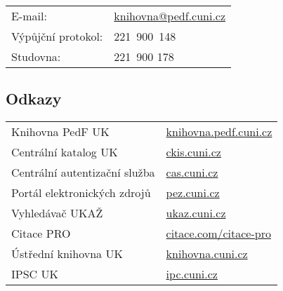 \begin{tabular}{@{}ll@{}}
  E-mail:& \url{knihovna@pedf.cuni.cz}\\

  Výpůjční protokol:& 221~900~148\\

  Studovna:& 221~900 178
\end{tabular}

\subsection{Odkazy}

\begin{tabular}{@{}ll@{}}
  Knihovna PedF UK& \url{knihovna.pedf.cuni.cz} \\

  Centrální katalog UK& \url{ckis.cuni.cz} \\

  Centrální autentizační služba& \url{cas.cuni.cz} \\

  Portál elektronických zdrojů& \url{pez.cuni.cz} \\

  Vyhledávač UKAŽ & \url{ukaz.cuni.cz} \\

  Citace PRO & \url{citace.com/citace-pro} \\

  Ústřední knihovna UK & \url{knihovna.cuni.cz} \\

  IPSC UK & \url{ipc.cuni.cz} 
\end{tabular}
